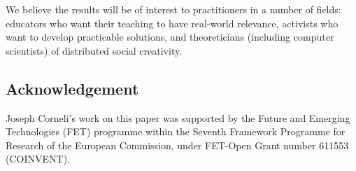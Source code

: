 We believe the results will be of interest to practitioners in a number of fields: educators who want their teaching to have real-world relevance, activists who want to develop practicable solutions, and theoreticians (including computer scientists) of distributed social creativity.

\subsection{Acknowledgement}
Joseph Corneli's work on this paper was supported by the Future and Emerging
Technologies (FET) programme within the Seventh Framework Programme
for Research of the European Commission, under FET-Open Grant number
611553 (COINVENT).

